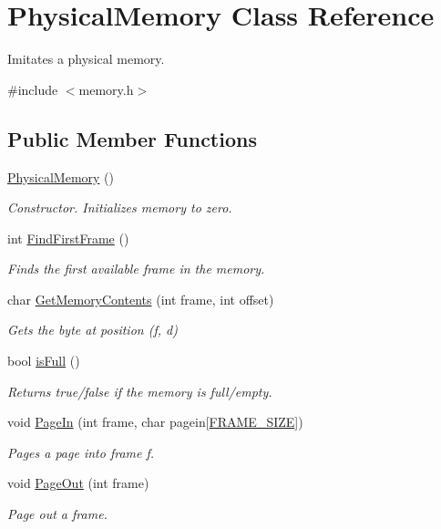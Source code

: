 \hypertarget{classPhysicalMemory}{}\section{Physical\+Memory Class Reference}
\label{classPhysicalMemory}


Imitates a physical memory.  




{\ttfamily \#include $<$memory.\+h$>$}

\subsection*{Public Member Functions}
\begin{DoxyCompactItemize}
\item 
\hyperlink{classPhysicalMemory_ad7fefaba61061c7339164836c6c02eaa}{Physical\+Memory} ()
\begin{DoxyCompactList}\small\item\em Constructor. Initializes memory to zero. \end{DoxyCompactList}\item 
int \hyperlink{classPhysicalMemory_a41ba2824ae9550b68036536d94ae8b32}{Find\+First\+Frame} ()
\begin{DoxyCompactList}\small\item\em Finds the first available frame in the memory. \end{DoxyCompactList}\item 
char \hyperlink{classPhysicalMemory_a2d6b5c45f2377838a76e58b2c083610a}{Get\+Memory\+Contents} (int frame, int offset)
\begin{DoxyCompactList}\small\item\em Gets the byte at position (f, d) \end{DoxyCompactList}\item 
bool \hyperlink{classPhysicalMemory_acde26e332e20349baa6c409b88635258}{is\+Full} ()
\begin{DoxyCompactList}\small\item\em Returns true/false if the memory is full/empty. \end{DoxyCompactList}\item 
void \hyperlink{classPhysicalMemory_a70cb4ae5b23f04cb347ac93cc9fc1028}{Page\+In} (int frame, char pagein\mbox{[}\hyperlink{memory_8h_af9b1b2ba12857a4bf11289dac8c5462d}{F\+R\+A\+M\+E\+\_\+\+S\+I\+ZE}\mbox{]})
\begin{DoxyCompactList}\small\item\em Pages a page into frame f. \end{DoxyCompactList}\item 
void \hyperlink{classPhysicalMemory_a6e1cf83f35ab25e879630783ebaecff3}{Page\+Out} (int frame)
\begin{DoxyCompactList}\small\item\em Page out a frame. \end{DoxyCompactList}\end{DoxyCompactItemize}


